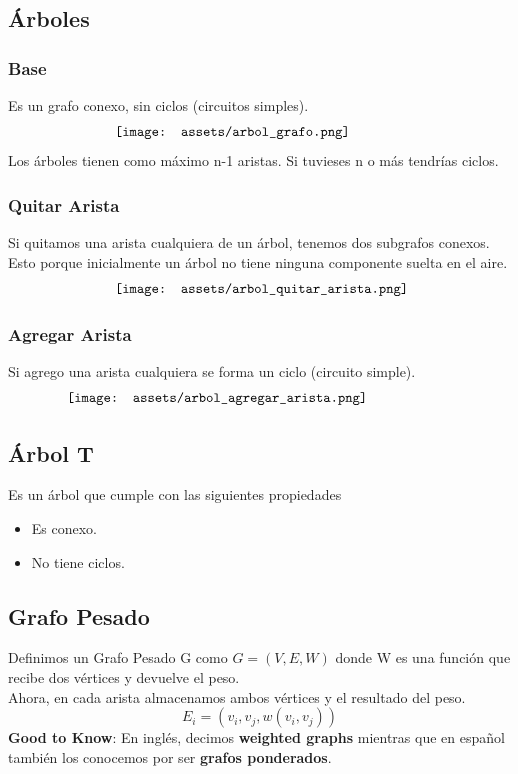 \documentclass[10pt,a4paper]{article}
\begin{document}
\subsection*{Árboles}
\subsubsection*{Base}
Es un grafo conexo, sin ciclos (circuitos simples).
\[\begin{minipage}[b]{0.6\textwidth}
    \texttt{[image: assets/arbol\_grafo.png]}
\end{minipage}\]
Los árboles tienen como máximo n-1 aristas. Si tuvieses n o más tendrías ciclos.
\subsubsection*{Quitar Arista}
Si quitamos una arista cualquiera de un árbol, tenemos dos subgrafos conexos. Esto porque inicialmente un árbol no tiene ninguna componente suelta en el aire. 
\[\begin{minipage}[b]{0.6\textwidth}
    \texttt{[image: assets/arbol\_quitar\_arista.png]}
\end{minipage}\]
\subsubsection*{Agregar Arista}
Si agrego una arista cualquiera se forma un ciclo (circuito simple).
\[\begin{minipage}[b]{0.8\textwidth}
    \texttt{[image: assets/arbol\_agregar\_arista.png]}
\end{minipage}\]
\subsection*{Árbol T}
Es un árbol que cumple con las siguientes propiedades
\begin{itemize}
    \item Es conexo.
    \item No tiene ciclos. 
\end{itemize}
\subsection*{Grafo Pesado}
Definimos un Grafo Pesado G como $G = (V, E, W)$ donde W es una función que recibe dos vértices y devuelve el peso. \\
Ahora, en cada arista almacenamos ambos vértices y el resultado del peso. 
\[E_{i} = (v_{i}, v_{j}, w(v_{i},v_{j}))\]
\textbf{Good to Know}: En inglés, decimos \textbf{weighted graphs} mientras que en español también los conocemos por ser \textbf{grafos ponderados}.
\end{document}
